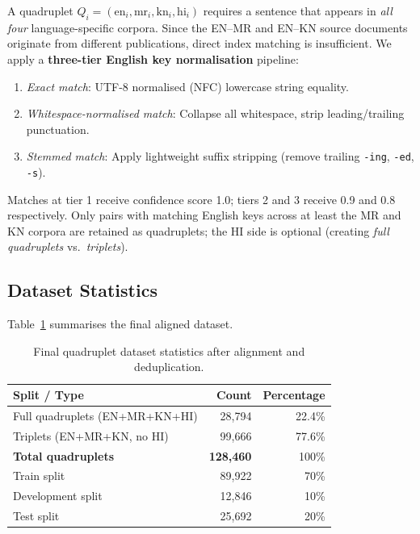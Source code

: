 \documentclass[11pt,a4paper]{article}
\begin{document}
A quadruplet $Q_i = (\text{en}_i, \text{mr}_i, \text{kn}_i, \text{hi}_i)$
requires a sentence that appears in \emph{all four} language-specific
corpora.
Since the EN--MR and EN--KN source documents originate from
different publications, direct index matching is insufficient.
We apply a \textbf{three-tier English key normalisation} pipeline:

\begin{enumerate}[leftmargin=*, label=\arabic*.]
  \item \textit{Exact match}: UTF-8 normalised (NFC) lowercase string equality.
  \item \textit{Whitespace-normalised match}: Collapse all whitespace, strip
    leading/trailing punctuation.
  \item \textit{Stemmed match}: Apply lightweight suffix stripping
    (remove trailing \texttt{-ing}, \texttt{-ed}, \texttt{-s}).
\end{enumerate}

Matches at tier 1 receive confidence score 1.0; tiers 2 and 3
receive 0.9 and 0.8 respectively.
Only pairs with matching English keys across at least the MR and KN
corpora are retained as quadruplets; the HI side is optional
(creating \emph{full quadruplets} vs.\ \emph{triplets}).

\subsection{Dataset Statistics}
Table~\ref{tab:quadstats} summarises the final aligned dataset.

\begin{table}[H]
\centering
\caption{Final quadruplet dataset statistics after alignment and deduplication.}
\label{tab:quadstats}
\begin{tabular}{lrr}
\toprule
\textbf{Split / Type} & \textbf{Count} & \textbf{Percentage} \\
\midrule
Full quadruplets (EN+MR+KN+HI) & 28,794  & 22.4\% \\
Triplets (EN+MR+KN, no HI)     & 99,666  & 77.6\% \\
\midrule
\textbf{Total quadruplets}      & \textbf{128,460} & 100\% \\
\midrule
Train split & 89,922 & 70\% \\
Development split & 12,846 & 10\% \\
Test split  & 25,692 & 20\% \\
\bottomrule
\end{tabular}
\end{table}
\end{document}
